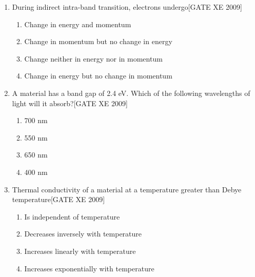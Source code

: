 \documentclass[journal,12pt,onecolumn]{IEEEtran}
\theoremstyle{remark}
\begin{document}
\begin{enumerate}
\begin{multicols}{2}
\begin{enumerate}
    \item High permeability
    \item High electrical resistivity
    \item High saturation magnetisation
    \item Low coercivity
\end{enumerate}
\end{multicols}



\item During indirect intra-band transition, electrons undergo\hfill[GATE XE 2009]

\begin{multicols}{2}
\begin{enumerate}
    \item Change in energy and momentum
    \item Change in momentum but no change in energy
    \item Change neither in energy nor in momentum
    \item Change in energy but no change in momentum
\end{enumerate}
\end{multicols}



\item A material has a band gap of 2.4 eV. Which of the following wavelengths of light will it absorb?\hfill[GATE XE 2009]

\begin{multicols}{2}
\begin{enumerate}
    \item 700 nm
    \item 550 nm
    \item 650 nm
    \item 400 nm
\end{enumerate}
\end{multicols}



\item Thermal conductivity of a material at a temperature greater than Debye temperature\hfill[GATE XE 2009]

\begin{multicols}{2}
\begin{enumerate}
    \item Is independent of temperature
    \item Decreases inversely with temperature
    \item Increases linearly with temperature
    \item Increases exponentially with temperature
\end{enumerate}
\end{multicols}







\end{enumerate}
\end{document}

